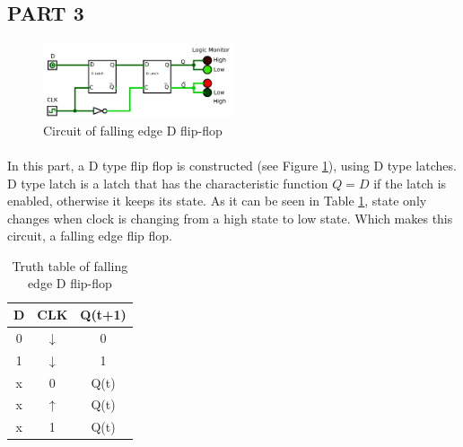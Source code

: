 \documentclass[pdftex,12pt,a4paper]{article}
\begin{document}
\newpage
\begin{flushleft}
\subsection{PART 3}

\begin{figure}[h]
	\centering
	\includegraphics[width=0.5\textwidth]{part3.png}	
	\caption{Circuit of falling edge D flip-flop}
	\label{fig:part3}
\end{figure}

\paragraph{}
In this part, a D type flip flop is constructed (see Figure \ref{fig:part3}), using D type latches. D type latch is a latch that has the characteristic function $Q = D$ if the latch is enabled, otherwise it keeps its state. As it can be seen in Table \ref{table:part3}, state only changes when clock is changing from a high state to low state. Which makes this circuit, a falling edge flip flop.


\begin{table}[h]
\begin{tabular}{cc|c}
D & CLK        & Q(t+1) \\ \hline
0 & $\downarrow$ & 0      \\
1 & $\downarrow$ & 1      \\
x & 0          & Q(t)   \\
x & $\uparrow$   & Q(t)   \\
x & 1          & Q(t)  
\end{tabular}
\centering
\caption{Truth table of falling edge D flip-flop}
\label{table:part3}
\end{table}


\end{flushleft}
\end{document}

